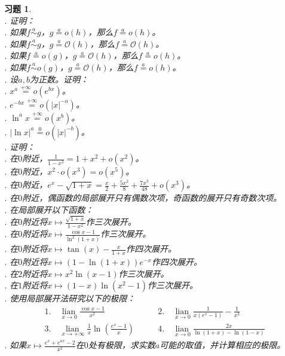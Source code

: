\documentclass[12pt,UTF8]{ctexbook}
\newcommand{\lian}[1]{
    \underset{#1}{\operatorname{lian}\,}
}
\newcommand{\oveq}[1]{\overset{#1}{=}}
\newcommand{\olim}[1]{\mathit{o}\left(#1\right)}  %
\newcommand{\Olim}[1]{\mathcal{O}\left(#1\right)}  %
\newcommand{\eqlim}[1]{\overset{#1}{\sim}}  %
\newtheorem{xt}{习题}[section]
\begin{document}
\begin{xt}
    \mbox{} \\
    . 证明：\\
    . 如果$f \eqlim{a} g$，$g \oveq{a} \olim{h}$，那么$f \oveq{a} \olim{h}$。\\
    . 如果$f \eqlim{a} g$，$g \oveq{a} \Olim{h}$，那么$f \oveq{a} \Olim{h}$。\\
    . 如果$f \oveq{a} \olim{g}$，$g \oveq{a} \Olim{h}$，那么$f \oveq{a} \olim{h}$。\\
    . 如果$f \eqlim{a} \olim{g}$，$g \oveq{a} \Olim{h}$，那么$f \oveq{a} \olim{h}$。\\
    . 设$a, b$为正数。证明：\\
    . $x^a \oveq{+\infty} \olim{e^{bx}}$。\\
    . $e^{-bx} \oveq{+\infty} \olim{|x|^{-a}}$。\\
    . $\ln^{a}{x} \oveq{+\infty} \olim{x^{b}}$。\\
    . $|\ln{x}|^{a} \oveq{0} \olim{|x|^{-b}}$。\\
    . 证明：\\
    . 在$0$附近，$\frac{1}{1 - x^2} = 1 + x^2 + \olim{x^2}$。\\
    . 在$0$附近，$x^2 \cdot \olim{x^3} = \olim{x^5}$。\\
    . 在$0$附近，$e^x - \sqrt{1 + x} = \frac{x}{2} + \frac{5x^2}{8} + \frac{7x^3}{48} + \olim{x^3}$。\\
    . 在$0$附近，偶函数的局部展开只有偶数次项，奇函数的展开只有奇数次项。\\
    . 在局部展开以下函数：\\
    . 在$0$附近将$x\mapsto \frac{\sqrt{1 + x}}{1 - x^2}$作三次展开。\\
    . 在$0$附近将$x\mapsto \frac{\cos{x} - 1}{\ln^2{(1 + x)}}$作三次展开。\\
    . 在$0$附近将$x\mapsto \tan{(x)} - \frac{x}{1 + x}$作四次展开。\\
    . 在$0$附近将$x\mapsto (1 - \ln{(1 + x)})e^{-x}$作四次展开。\\
    . 在$2$附近将$x\mapsto x^2\ln{(x - 1)}$作三次展开。\\
    . 在$1$附近将$x\mapsto (1 - x)\ln{(x^2 - 1)}$作三次展开。\\
    . 使用局部展开法研究以下的极限：\\
    $$
    \begin{array}{ll}
        1. \quad \lian{x\to 0} \frac{\cos{x} - 1}{x^2} & \qquad 2. \quad \lian{x\to 0} \frac{1}{x \left(e^x - 1\right)} - \frac{1}{x^2} \\
        3. \quad \lian{x\to +\infty} \frac{1}{x}\ln{\left(\frac{e^x - 1}{x}\right)} & \qquad 4. \quad \lian{x\to 0} \frac{2x}{\ln{(1+x)} - \ln{(1-x)}} 
    \end{array}
    $$
    . 如果$x \mapsto \frac{e^{x} + e^{ax} - 2}{x^2}$在$0$处有极限，求实数$a$可能的取值，并计算相应的极限。
\end{xt}
\end{document}
